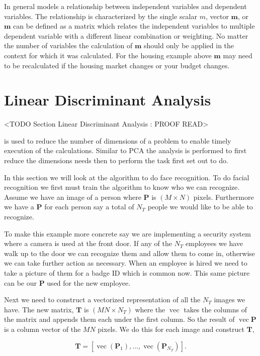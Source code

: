 In general  models a relationship between independent variables and dependent variables. The relationship is characterized by the single scalar $m$, vector $\mathbf{m}$, or $\mathbf{m}$ can be defined as a matrix which relates the independent variables to multiple dependent variable with a different linear combination or weighting. No matter the number of variables the calculation of $\mathbf{m}$ should only be applied in the context for which it was calculated. For the housing example above $\mathbf{m}$ may need to be recalculated if the housing market changes or your budget changes. 


\section{Linear Discriminant Analysis}
	<TODO Section Linear Discriminant Analysis : PROOF READ>

 is used to reduce the number of dimensions of a problem to enable timely execution of the calculations. Similar to \ac{PCA} the analysis is performed to first reduce the dimensions needs then to perform the task first set out to do. 

In this section we will look at the algorithm to do face recognition. To do facial recognition we first must train the algorithm to know who we can recognize. Assume we have an image of a person where $\mathbf{P}$ is $(M\times N)$ pixels. Furthermore we have a $\mathbf{P}$ for each person say a total of $N_T$ people we would like to be able to recognize. 

To make this example more concrete say we are implementing a security system where a camera is used at the front door. If any of the $N_T$ employees we have walk up to the door we can recognize them and allow them to come in, otherwise we can take further action as necessary. When an employee is hired we need to take a picture of them for a badge \ac{ID} which is common now. This same picture can be our $\mathbf{P}$ used for the new employee. 

Next we need to construct a vectorized representation of all the $N_T$ images we have. The new matrix, $\mathbf{T}$ is $(MN\times N_T)$ where the $\operatorname{vec}$ takes the columns of the matrix and appends them each under the first column. So the result of $\operatorname{vec}{\mathbf{P}}$ is a column vector of the $MN$ pixels. We do this for each image and construct $\mathbf{T}$,
	
\begin{equation}
\mathbf{T} = \left[\operatorname{vec}(\mathbf{P}_1),\dots,\operatorname{vec}(\mathbf{P}_{N_T})\right].
\end{equation}	
	
